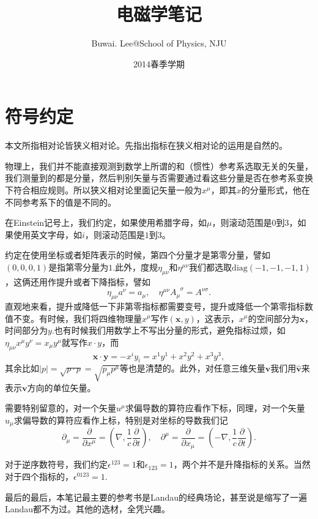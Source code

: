 \documentclass[10pt]{book}
\begin{document}
\title{电磁学笔记}
\author{Buwai. Lee@School of Physics, NJU}
\date{2014春季学期}
\maketitle %
\frontmatter

\tableofcontents
\clearpage
\section*{符号约定}
本文所指相对论皆狭义相对论。先指出指标在狭义相对论的运用是自然的。

物理上，我们并不能直接观测到数学上所谓的和（惯性）参考系选取无关的矢量，我们测量到的都是分量，然后判别矢量与否需要通过看这些分量是否在参考系变换下符合相应规则。所以狭义相对论里面记矢量一般为$x^\mu$，即其$x$的分量形式，他在不同参考系下的值是不同的。

在Einstein记号上，我们约定，如果使用希腊字母，如$\mu$，则滚动范围是$0$到$3$，如果使用英文字母，如$i$，则滚动范围是$1$到$3$。

约定在使用坐标或者矩阵表示的时候，第四个分量才是第零分量，譬如$(0,0,0,1)$是指第零分量为$1$.此外，度规$\eta_{\mu\nu}$和$\eta^{\mu\nu}$我们都选取$\mathrm{diag}(-1,-1,-1,1)$，这俩还用作提升或者下降指标，譬如
\[
\eta_{\mu\nu}a^\nu=a_\mu,\quad \eta^{\mu\nu}A_\mu^{\phantom{\mu}\sigma}=A^{\nu\sigma}.
\]
直观地来看，提升或降低一下非第零指标都需要变号，提升或降低一个第零指标数值不变。有时候，我们将四维物理量$x^\mu$写作$(\bm{x},y)$，这表示，$x^\mu$的空间部分为$\bm{x}$，时间部分为$y$.也有时候我们用数学上不写出分量的形式，避免指标过烦，如$\eta_{\mu\nu}x^\mu y^\nu=x_\mu y^\mu$就写作$x\cdot y$，而\[\bm{x}\cdot \bm{y}=-x^i y_i=x^1y^1+x^2y^2+x^3y^3,\]
其余比如$|p|=\sqrt{p\cdot p}=\sqrt{p_\mu p^\mu}$等也是清楚的。此外，对任意三维矢量$\bm{v}$我们用$\hat{\bm{v}}$来表示$\bm{v}$方向的单位矢量。

需要特别留意的，对一个矢量$u^\mu$求偏导数的算符应看作下标，同理，对一个矢量$u_\mu$求偏导数的算符应看作上标，特别是对坐标的导数我们记
\[
	\partial_\mu=\frac{\partial}{\partial x^\mu}=\left(\nabla,\frac{1}{c} \frac{\partial}{\partial t}\right),\quad \partial^\mu=\frac{\partial}{\partial x_\mu}=\left(-\nabla,\frac{1}{c} \frac{\partial}{\partial t}\right).
\]

对于逆序数符号，我们约定$\epsilon^{123}=1$和$\epsilon_{123}=1$，两个并不是升降指标的关系。当然对于四个指标的，$\epsilon^{0123}=1$.

最后的最后，本笔记最主要的参考书是Landau的经典场论，甚至说是缩写了一遍Landau都不为过。其他的选材，全凭兴趣。
\end{document}
